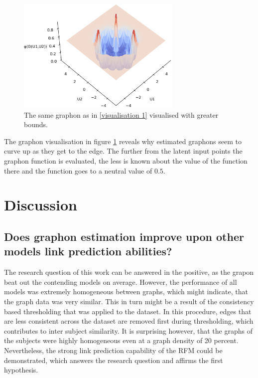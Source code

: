 \documentclass[11pt]{report} %
\begin{document}
\begin{figure}[H]
    \center
    \includegraphics[width= 0.7\textwidth]{fakegraphon}%
    \caption{The same graphon as in \ref{visualisation 1} visualised with greater bounds.}
    \label{fakegraphon}
\end{figure}
\noindent
The graphon visualisation in figure \ref{fakegraphon} reveals why estimated graphons seem to curve up as they get to the edge. The further from the latent input points the graphon function is evaluated, the less is known about the value of the function there and the function goes to a neutral value of $0.5$.
 \chapter{Discussion}
\section{ Does graphon estimation improve upon other models link prediction abilities?}
The research question of this work can be answered in the positive, as the grapon beat out the contending models on average. However, the performance of all models was extremely homogeneous between graphs, which might indicate, that the graph data was very similar. This in turn might be a result of the consistency based thresholding that was applied to the dataset. In this procedure, edges that are less consistent across the dataset are removed first during thresholding, which contributes to inter subject similarity. It is surprising however, that the graphs of the subjects were highly homogeneous even at a graph density of 20 percent. Nevertheless, the strong link prediction capability of the RFM could be demonstrated, which answers the research question and affirms the first hypothesis.
\end{document}
